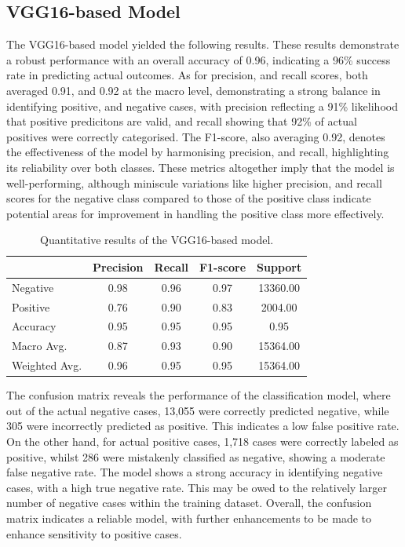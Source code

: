 \documentclass[../main]{subfiles}
\begin{document}
\subsection{VGG16-based Model}
The VGG16-based model yielded the following results. These results demonstrate a robust performance with an overall accuracy of 0.96, indicating a 96\% success rate in predicting actual outcomes. As for precision, and recall scores, both averaged 0.91, and 0.92 at the macro level, demonstrating a strong balance in identifying positive, and negative cases, with precision reflecting a 91\% likelihood that positive predicitons are valid, and recall showing that 92\% of actual positives were correctly categorised. The F1-score, also averaging 0.92, denotes the effectiveness of the model by harmonising precision, and recall, highlighting its reliability over both classes. These metrics altogether imply that the model is well-performing, although miniscule variations like higher precision, and recall scores for the negative class compared to those of the positive class indicate potential areas for improvement in handling the positive class more effectively.

\begin{table}[h]
    \centering
    \begin{tabular}{|l|c|c|c|c|}
        \hline
         & Precision & Recall & F1-score & Support \\ \hline
        Negative & 0.98 & 0.96 & 0.97 & 13360.00 \\ \hline
        Positive & 0.76 & 0.90 & 0.83 & 2004.00 \\ \hline
        Accuracy & 0.95 & 0.95 & 0.95 & 0.95 \\ \hline
        Macro Avg. & 0.87 & 0.93 & 0.90 & 15364.00 \\ \hline
        Weighted Avg. & 0.96 & 0.95 & 0.95 & 15364.00 \\ \hline
    \end{tabular}
    \caption{Quantitative results of the VGG16-based model.}
    \label{tab:quantitative-results-vgg16}
\end{table}

\noindent The confusion matrix reveals the performance of the classification model, where out of the actual negative cases, 13,055 were correctly predicted negative, while 305 were incorrectly predicted as positive. This indicates a low false positive rate. On the other hand, for actual positive cases, 1,718 cases were correctly labeled as positive, whilst 286 were mistakenly classified as negative, showing a moderate false negative rate. The model shows a strong accuracy in identifying negative cases, with a high true negative rate. This may be owed to the relatively larger number of negative cases within the training dataset. Overall, the confusion matrix indicates a reliable model, with further enhancements to be made to enhance sensitivity to positive cases.
\end{document}
